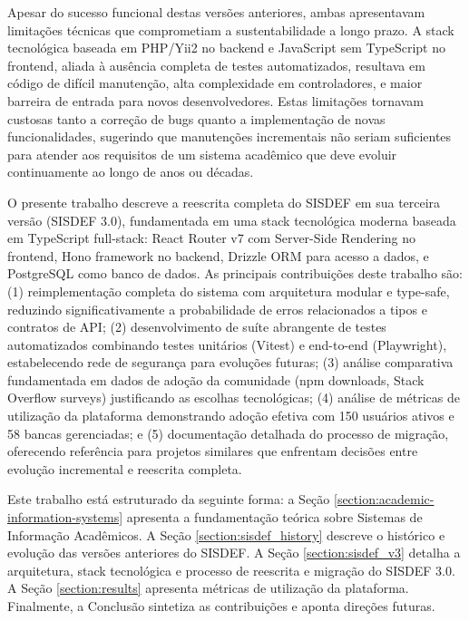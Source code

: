 \documentclass[nonacm, sigconf]{acmart}
\begin{document}
Apesar do sucesso funcional destas versões anteriores, ambas apresentavam limitações técnicas que comprometiam a sustentabilidade a longo prazo. A stack tecnológica baseada em PHP/Yii2 no backend e JavaScript sem TypeScript no frontend, aliada à ausência completa de testes automatizados, resultava em código de difícil manutenção, alta complexidade em controladores, e maior barreira de entrada para novos desenvolvedores. Estas limitações tornavam custosas tanto a correção de bugs quanto a implementação de novas funcionalidades, sugerindo que manutenções incrementais não seriam suficientes para atender aos requisitos de um sistema acadêmico que deve evoluir continuamente ao longo de anos ou décadas.

O presente trabalho descreve a reescrita completa do SISDEF em sua terceira versão (SISDEF 3.0), fundamentada em uma stack tecnológica moderna baseada em TypeScript full-stack: React Router v7 com Server-Side Rendering no frontend, Hono framework no backend, Drizzle ORM para acesso a dados, e PostgreSQL como banco de dados. As principais contribuições deste trabalho são: (1) reimplementação completa do sistema com arquitetura modular e type-safe, reduzindo significativamente a probabilidade de erros relacionados a tipos e contratos de API; (2) desenvolvimento de suíte abrangente de testes automatizados combinando testes unitários (Vitest) e end-to-end (Playwright), estabelecendo rede de segurança para evoluções futuras; (3) análise comparativa fundamentada em dados de adoção da comunidade (npm downloads, Stack Overflow surveys) justificando as escolhas tecnológicas; (4) análise de métricas de utilização da plataforma demonstrando adoção efetiva com 150 usuários ativos e 58 bancas gerenciadas; e (5) documentação detalhada do processo de migração, oferecendo referência para projetos similares que enfrentam decisões entre evolução incremental e reescrita completa.

Este trabalho está estruturado da seguinte forma: a Seção \ref{section:academic-information-systems} apresenta a fundamentação teórica sobre Sistemas de Informação Acadêmicos. A Seção \ref{section:sisdef_history} descreve o histórico e evolução das versões anteriores do SISDEF. A Seção \ref{section:sisdef_v3} detalha a arquitetura, stack tecnológica e processo de reescrita e migração do SISDEF 3.0. A Seção \ref{section:results} apresenta métricas de utilização da plataforma. Finalmente, a Conclusão sintetiza as contribuições e aponta direções futuras.

\end{document}
